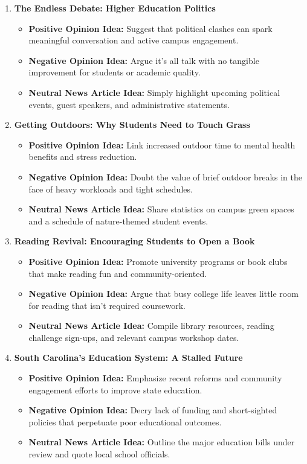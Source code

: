 \documentclass{article}
\begin{document}
\begin{enumerate}
    \item \textbf{The Endless Debate: Higher Education Politics}
    \begin{itemize}
        \item \textbf{Positive Opinion Idea:} Suggest that political clashes can spark meaningful conversation and active campus engagement.
        \item \textbf{Negative Opinion Idea:} Argue it’s all talk with no tangible improvement for students or academic quality.
        \item \textbf{Neutral News Article Idea:} Simply highlight upcoming political events, guest speakers, and administrative statements.
    \end{itemize}

    \item \textbf{Getting Outdoors: Why Students Need to Touch Grass}
    \begin{itemize}
        \item \textbf{Positive Opinion Idea:} Link increased outdoor time to mental health benefits and stress reduction.
        \item \textbf{Negative Opinion Idea:} Doubt the value of brief outdoor breaks in the face of heavy workloads and tight schedules.
        \item \textbf{Neutral News Article Idea:} Share statistics on campus green spaces and a schedule of nature-themed student events.
    \end{itemize}

    \item \textbf{Reading Revival: Encouraging Students to Open a Book}
    \begin{itemize}
        \item \textbf{Positive Opinion Idea:} Promote university programs or book clubs that make reading fun and community-oriented.
        \item \textbf{Negative Opinion Idea:} Argue that busy college life leaves little room for reading that isn’t required coursework.
        \item \textbf{Neutral News Article Idea:} Compile library resources, reading challenge sign-ups, and relevant campus workshop dates.
    \end{itemize}

    \item \textbf{South Carolina’s Education System: A Stalled Future}
    \begin{itemize}
        \item \textbf{Positive Opinion Idea:} Emphasize recent reforms and community engagement efforts to improve state education.
        \item \textbf{Negative Opinion Idea:} Decry lack of funding and short-sighted policies that perpetuate poor educational outcomes.
        \item \textbf{Neutral News Article Idea:} Outline the major education bills under review and quote local school officials.
    \end{itemize}


\end{enumerate}
\end{document}
